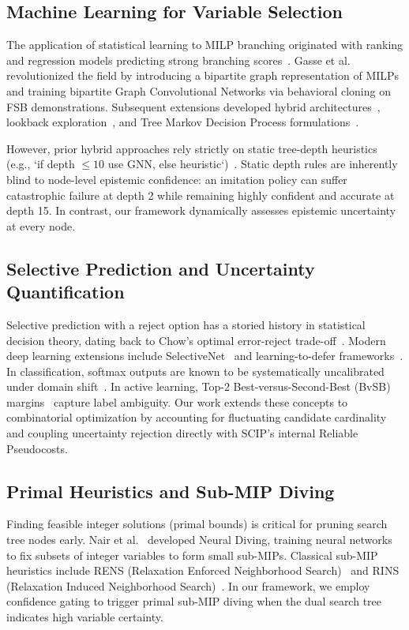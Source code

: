 \documentclass[10pt,twocolumn,letterpaper]{article}
\theoremstyle{plain}
\theoremstyle{definition}
\theoremstyle{remark}
\begin{document}
\subsection{Machine Learning for Variable Selection}
The application of statistical learning to MILP branching originated with ranking and regression models predicting strong branching scores~\cite{alvarez2017machine,khalil2016learning}. Gasse et al.~\cite{gasse2019exact} revolutionized the field by introducing a bipartite graph representation of MILPs and training bipartite Graph Convolutional Networks via behavioral cloning on FSB demonstrations. Subsequent extensions developed hybrid architectures~\cite{gupta2020hybrid}, lookback exploration~\cite{gupta2022lookback}, and Tree Markov Decision Process formulations~\cite{scavuzzo2022learning,scavuzzo2024machine}. 

However, prior hybrid approaches rely strictly on static tree-depth heuristics (e.g., `if depth $\le 10$ use GNN, else heuristic`)~\cite{gupta2020hybrid}. Static depth rules are inherently blind to node-level epistemic confidence: an imitation policy can suffer catastrophic failure at depth 2 while remaining highly confident and accurate at depth 15. In contrast, our framework dynamically assesses epistemic uncertainty at every node.

\subsection{Selective Prediction and Uncertainty Quantification}
Selective prediction with a reject option has a storied history in statistical decision theory, dating back to Chow's optimal error-reject trade-off~\cite{chow1970optimum}. Modern deep learning extensions include SelectiveNet~\cite{geifman2019selectivenet} and learning-to-defer frameworks~\cite{madras2018predictive}. In classification, softmax outputs are known to be systematically uncalibrated under domain shift~\cite{guo2017calibration}. In active learning, Top-2 Best-versus-Second-Best (BvSB) margins~\cite{joshi2009multi} capture label ambiguity. Our work extends these concepts to combinatorial optimization by accounting for fluctuating candidate cardinality and coupling uncertainty rejection directly with SCIP's internal Reliable Pseudocosts.

\subsection{Primal Heuristics and Sub-MIP Diving}
Finding feasible integer solutions (primal bounds) is critical for pruning search tree nodes early. Nair et al.~\cite{nair2020solving} developed Neural Diving, training neural networks to fix subsets of integer variables to form small sub-MIPs. Classical sub-MIP heuristics include RENS (Relaxation Enforced Neighborhood Search)~\cite{berthold2014rens} and RINS (Relaxation Induced Neighborhood Search)~\cite{danna2005rins}. In our framework, we employ confidence gating to trigger primal sub-MIP diving when the dual search tree indicates high variable certainty.
\end{document}
